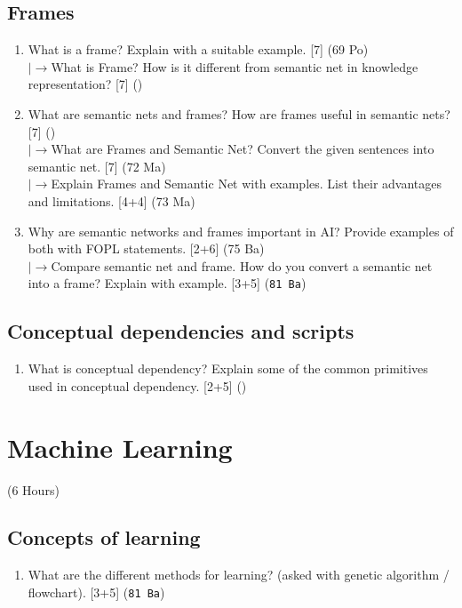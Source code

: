 \documentclass[12pt]{article}
\newcommand{\lb}{\\$\left|\rightarrow\right.$}
\begin{document}
  \subsection{Frames}
    \begin{enumerate}[topsep=0pt, noitemsep]
      \item What is a frame? Explain with a suitable example. \hfill [7] (69 Po)
        \lb What is Frame? How is it different from semantic net in knowledge representation? \hfill [7] ()

      \item What are semantic nets and frames? How are frames useful in semantic nets? \hfill [7] ()
        \lb What are Frames and Semantic Net? Convert the given sentences into semantic net. \hfill [7] (72 Ma)
        \lb Explain Frames and Semantic Net with examples. List their advantages and limitations. \hfill [4+4] (73 Ma)

      \item Why are semantic networks and frames important in AI? Provide examples of both with FOPL statements. \hfill [2+6] (75 Ba)
        \lb Compare semantic net and frame. How do you convert a semantic net into a frame? Explain with example. \hfill [3+5] (\texttt{81 Ba})
    \end{enumerate}

  \subsection{Conceptual dependencies and scripts}
    \begin{enumerate}[topsep=0pt, noitemsep]
      \item What is conceptual dependency? Explain some of the common primitives used in conceptual dependency. \hfill [2+5] ()
    \end{enumerate}

\pagebreak
\section{Machine Learning}
\begin{center}(6 Hours)\end{center}

  \subsection{Concepts of learning}
    \begin{enumerate}[topsep=0pt, noitemsep]
      \item What are the different methods for learning? (asked with genetic algorithm / flowchart). \hfill [3+5] (\texttt{81 Ba})
    \end{enumerate}
\end{document}
